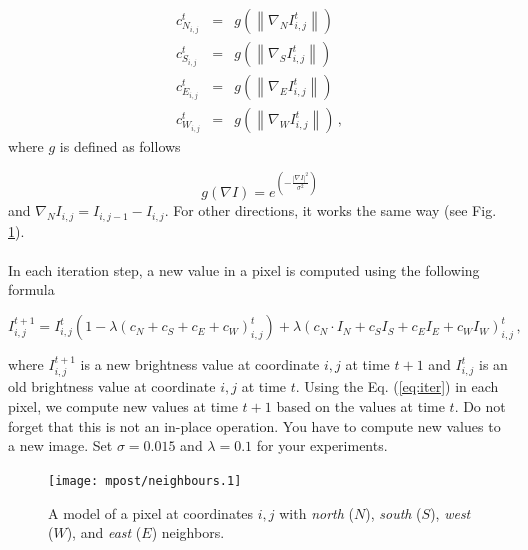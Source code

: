 \documentclass[12pt]{article}
\begin{document}
\begin{eqnarray} \label{eq:conduct}
    c_{N_{i,j}}^{t} &=& g \left(\left\|\nabla_N I_{i,j}^{t}\right\|\right) \nonumber \\
    c_{S_{i,j}}^{t} &=& g \left(\left\|\nabla_S I_{i,j}^{t}\right\|\right) \nonumber \\
    c_{E_{i,j}}^{t} &=& g \left(\left\|\nabla_E I_{i,j}^{t}\right\|\right) \nonumber \\
    c_{W_{i,j}}^{t} &=& g \left(\left\|\nabla_W I_{i,j}^{t}\right\|\right) \, ,
\end{eqnarray}
where $g$ is defined as follows

\begin{equation}
    g(\nabla I) = e^{\left(-\frac{\left| \nabla I\right|^2}{\sigma^2}\right)}
\end{equation}
and $\nabla_N I_{i,j} = I_{i,j-1} - I_{i,j}$. For other directions, it works the same way (see Fig. \ref{fig:neighborhood}).
\\
\\
\noindent
In each iteration step, a new value in a pixel is computed using the following formula

\begin{equation} \label{eq:iter}
    I_{i,j}^{t+1} = I_{i,j}^{t} \left( 1 - \lambda \left( c_N + c_S + c_E + c_W \right)_{i,j}^{t}\right) + \lambda \left( c_N \cdot I_N + c_S I_S + c_E I_E + c_W I_W \right)_{i,j}^{t} \, ,
\end{equation}


where $I_{i,j}^{t+1}$ is a new brightness value at coordinate $i,j$ at time $t+1$ and $I_{i,j}^t$ is an old brightness
value at coordinate $i,j$ at time $t$. Using the Eq. (\ref{eq:iter}) in each pixel, we compute new values at time $t+1$
based on the values at time $t$. Do not forget that this is not an in-place operation. You have to compute new values
to a new image.
\newline
\newline
Set $\sigma = 0.015$ and $\lambda = 0.1$ for your experiments.
\newline
\begin{figure}
    \centering
    \texttt{[image: mpost/neighbours.1]}
    \caption{A model of a pixel at coordinates $i,j$ with \textit{north} ($N$), \textit{south} ($S$), \textit{west} ($W$),
    and \textit{east} ($E$) neighbors.}
    \label{fig:neighborhood}
\end{figure}
\end{document}
